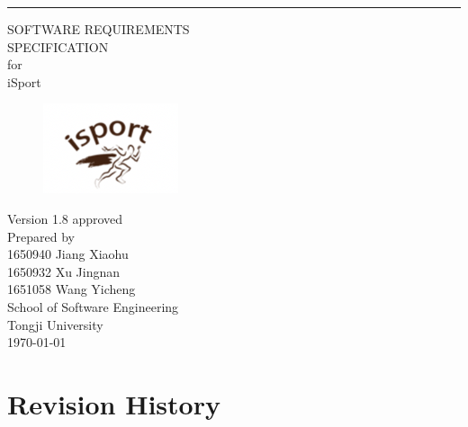 \documentclass[16pt]{scrreprt}
\date{}
\def\myversion{1.8 }
\begin{document}
\begin{flushright}
    \rule{16cm}{5pt}\vskip1cm
    \begin{bfseries}
        \LARGE{SOFTWARE REQUIREMENTS\\ SPECIFICATION}\\
        \vspace{0.8cm}
        for\\
        \vspace{0.8cm}
        iSport\\
        \begin{figure}[H]
        \flushright
          \includegraphics[width=.2\textwidth]{figures/logo.png}
        \end{figure}
        \vspace{0.8cm}
        \normalsize{Version \myversion approved}\\
        \vspace{1.0cm}
        Prepared by\vspace{0.5cm} \\ 
        \normalsize{1650940 Jiang Xiaohu\\1650932 Xu Jingnan\\1651058 Wang Yicheng}
        \\
        \vspace{1.1cm}
        \normalsize{School of Software Engineering\\ Tongji University}\\
        \vspace{1.0cm}
        \today\\
    \end{bfseries}
\end{flushright}

\tableofcontents


\chapter*{Revision History}
\end{document}
